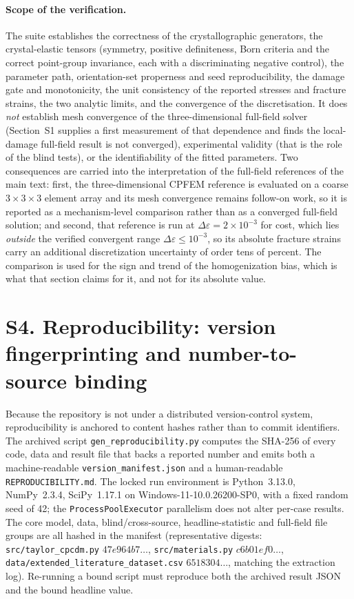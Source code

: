 \documentclass[12pt,a4paper,twocolumn]{article}
\begin{document}
\paragraph{Scope of the verification.} The suite establishes the correctness of the crystallographic
generators, the crystal-elastic tensors (symmetry, positive definiteness, Born criteria and the correct
point-group invariance, each with a discriminating negative control), the parameter path, orientation-set
properness and seed reproducibility, the damage gate and monotonicity, the unit consistency of the
reported stresses and fracture strains, the two analytic limits, and the convergence of the
discretisation. It does \emph{not} establish mesh convergence of the three-dimensional full-field solver (Section~S1 supplies a first measurement of that dependence and finds the local-damage full-field result is not converged),
experimental validity (that is the role of the blind tests), or the identifiability of the fitted
parameters. Two consequences are carried into the interpretation of the full-field references of
the main text: first, the three-dimensional CPFEM reference is evaluated on a coarse
$3\times3\times3$ element array and its mesh convergence remains follow-on work, so it is reported as a
mechanism-level comparison rather than as a converged full-field solution; and second, that reference is
run at $\Delta\varepsilon = 2\times10^{-3}$ for cost, which lies \emph{outside} the verified convergent
range $\Delta\varepsilon \le 10^{-3}$, so its absolute fracture strains carry an additional
discretization uncertainty of order tens of percent. The comparison is used for the sign and trend of the
homogenization bias, which is what that section claims for it, and not for its absolute value.

\section*{S4. Reproducibility: version fingerprinting and number-to-source binding}

Because the repository is not under a distributed version-control system, reproducibility is anchored to
content hashes rather than to commit identifiers. The archived script \texttt{gen\_reproducibility.py}
computes the SHA-256 of every code, data and result file that backs a reported number and emits both a
machine-readable \texttt{version\_manifest.json} and a human-readable \texttt{REPRODUCIBILITY.md}. The locked
run environment is Python~3.13.0, NumPy~2.3.4, SciPy~1.17.1 on Windows-11-10.0.26200-SP0, with a fixed
random seed of 42; the \texttt{ProcessPoolExecutor} parallelism does not alter per-case results. The core
model, data, blind/cross-source, headline-statistic and full-field file groups are all hashed in the
manifest (representative digests: \texttt{src/taylor\_cpcdm.py} $47e964b7\ldots$, \texttt{src/materials.py}
$c6b01ef0\ldots$, \texttt{data/extended\_literature\_dataset.csv} $6518304\ldots$, matching the extraction
log). Re-running a bound script must reproduce both the archived result JSON and the bound headline value.
\end{document}
